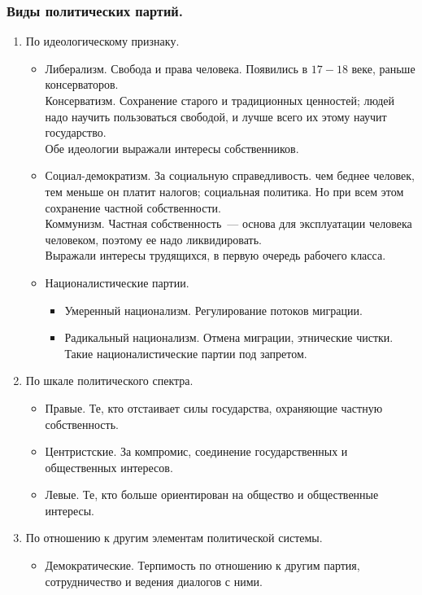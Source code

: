 \documentclass[12pt]{article}
\begin{document}
	\subsubsection{Виды политических партий.}
	\begin{enumerate}
		\item По идеологическому признаку.
		\begin{itemize}
			\item Либерализм. Свобода и права человека. Появились в $17 - 18$ веке, раньше консерваторов. \\
			Консерватизм. Сохранение старого и традиционных ценностей; людей надо научить пользоваться свободой, и лучше всего их этому научит государство. \\
			Обе идеологии выражали интересы собственников.
			\item Социал-демократизм. За социальную справедливость. чем беднее человек, тем меньше он платит налогов; социальная политика. Но при всем этом сохранение частной собственности. \\
			Коммунизм. Частная собственность~--- основа для эксплуатации человека человеком, поэтому ее надо ликвидировать. \\
			Выражали интересы трудящихся, в первую очередь рабочего класса.
			\item Националистические партии.
			\begin{itemize}
				\item Умеренный национализм. Регулирование потоков миграции.
				\item Радикальный национализм. Отмена миграции, этнические чистки. Такие националистические партии под запретом.
			\end{itemize}
		\end{itemize}
		\item По шкале политического спектра.
		\begin{itemize}
			\item Правые. Те, кто отстаивает силы государства, охраняющие частную собственность.
			\item Центристские. За компромис, соединение государственных и общественных интересов.
			\item Левые. Те, кто больше ориентирован на общество и общественные интересы.
		\end{itemize}
		\item По отношению к другим элементам политической системы.
		\begin{itemize}
			\item Демократические. Терпимость по отношению к другим партия, сотрудничество и ведения диалогов с ними.

\end{itemize}
\end{enumerate}
\end{document}
